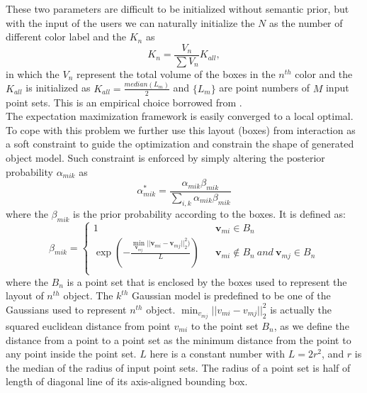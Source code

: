 These two parameters are difficult to be initialized without semantic prior, but with the input of the users we can naturally initialize the $N$ as the number of different color label and the ${K_n}$ as 
\begin{equation}
\label{equ:K_n}
K_n=\frac{V_n}{\sum V_n}K_{all},
\end{equation}
in which the $V_n$ represent the total volume of the boxes in the $n^{th}$ color and the $K_{all}$ is initialized as $K_{all}=\frac{median(L_m)}{2}$ and $\{L_m\}$ are point numbers of $M$ input point sets. This is an empirical choice borrowed from \cite{Evangelidis2014}.\\
%
The expectation maximization framework is easily converged to a local optimal. To cope with this problem we further use this layout (boxes) from interaction as a soft constraint to guide the optimization and constrain the shape of generated object model. Such constraint is enforced by simply altering the posterior probability $\alpha_{mik}$ as
%
\begin{equation}
\label{equ:alteralpha}
\alpha_{mik}^*=\frac{\alpha_{mik}\beta_{mik}}{\sum_{i,k}\alpha_{mik}\beta_{mik}}
\end{equation}
where the $\beta_{mik}$ is the prior probability according to the boxes. It is defined as:
\begin{equation}
\beta_{mik}=\left\{
\begin{array}{rcl}
1& &\mathbf v_{mi} \in B_n\\
\exp(-\frac{\min_{\mathbf v_{mj}}|| \mathbf v_{mi} - \mathbf v_{mj} ||_2^2  )}{L})& &\mathbf v_{mi} \notin B_n~and~\mathbf v_{mj} \in B_n\\
\end{array} \right.
\end{equation}
where the $B_n$ is a point set that is enclosed by the boxes used to represent the layout of $n^{th}$ object. The $k^{th}$ Gaussian model is predefined to be one of the Gaussians used to represent $n^{th}$ object. $\min_{v_{mj}}|| v_{mi} - v_{mj} ||_2^2$ is actually the squared euclidean distance from point $v_{mi}$ to the point set $B_n$, as we define the distance from a point to a point set as the minimum distance from the point to any point inside the point set. $L$ here is a constant number with $L=2r^2$, and $r$ is the median of the radius of input point sets. The radius of a point set is half of length of diagonal line of its axis-aligned bounding box.   
